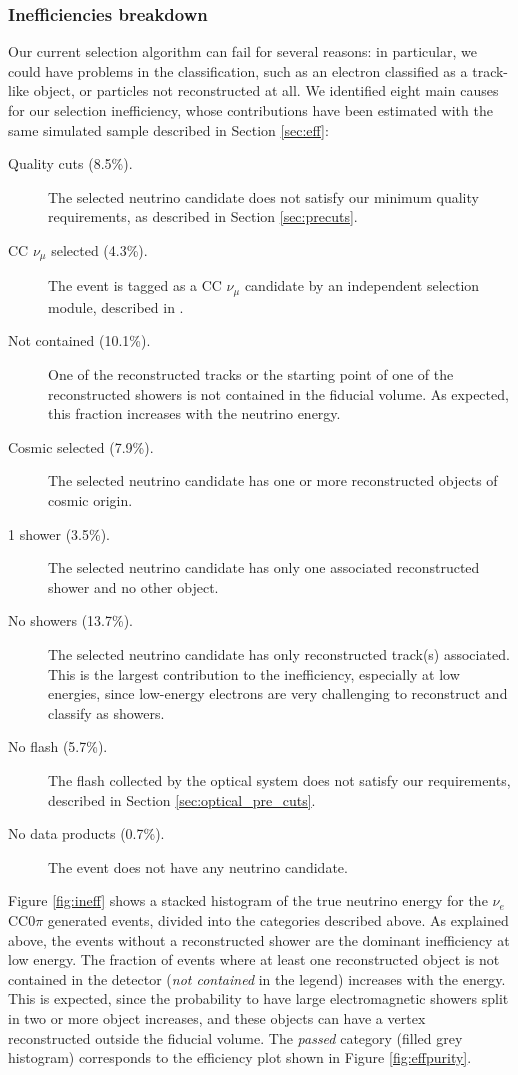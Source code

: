\subsubsection{Inefficiencies breakdown}\label{sec:ineff}
Our current selection algorithm can fail for several reasons: in particular, we could have problems in the classification, such as an electron classified as a track-like object, or particles not reconstructed at all. We identified eight main causes for our selection inefficiency, whose contributions have been estimated with the same simulated sample described in Section \ref{sec:eff}:
\begin{description}

\item[Quality cuts (8.5\%).] {The selected neutrino candidate does not satisfy our minimum quality requirements, as described in Section \ref{sec:precuts}.}
\item[CC $\nu_{\mu}$ selected (4.3\%).]  {The event is tagged as a CC $\nu_{\mu}$ candidate by an independent selection module, described in \cite{ubxsec}}. 
\item[Not contained (10.1\%).] {One of the reconstructed tracks or the starting point of one of the reconstructed showers is not contained in the fiducial volume. As expected, this fraction increases with the neutrino energy}.
\item[Cosmic selected (7.9\%).] {The selected neutrino candidate has one or more reconstructed objects of cosmic origin}.
\item[1 shower (3.5\%).] {The selected neutrino candidate has only one associated reconstructed shower and no other object}. 
\item[No showers (13.7\%).]  {The selected neutrino candidate has only reconstructed track(s) associated. This is the largest contribution to the inefficiency, especially at low energies, since low-energy electrons are very challenging to reconstruct and classify as showers.}
\item[No flash (5.7\%).]  {The flash collected by the optical system does not satisfy our requirements, described in Section \ref{sec:optical_pre_cuts}}.
\item[No data products (0.7\%).] {The event does not have any neutrino candidate}.
\end{description}

Figure \ref{fig:ineff} shows a stacked histogram of the true neutrino energy for the $\nu_e$ CC0$\pi$ generated events, divided into the categories described above. As explained above, the events without a reconstructed shower are the dominant inefficiency at low energy. The fraction of events where at least one reconstructed object is not contained in the detector (\emph{not contained} in the legend) increases with the energy. This is expected, since the probability to have large electromagnetic showers split in two or more object increases, and these objects can have a vertex reconstructed outside the fiducial volume. The \emph{passed} category (filled grey histogram) corresponds to the efficiency plot shown in Figure \ref{fig:effpurity}.


